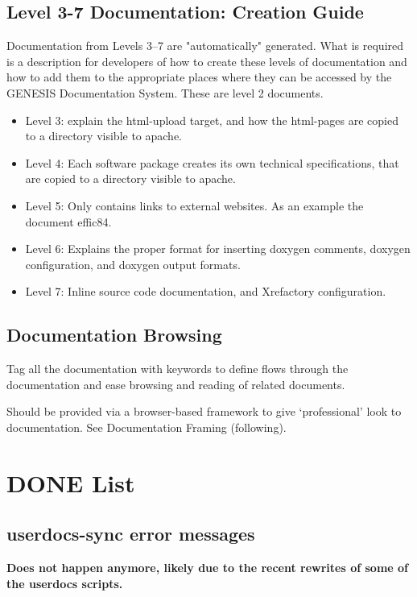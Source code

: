 \documentclass[12pt]{article}
\begin{document}
\subsection{Level 3-7 Documentation: Creation Guide}

Documentation from Levels 3--7 are "automatically" generated. What is
required is a description for developers of how to create these levels
of documentation and how to add them to the appropriate places where
they can be accessed by the GENESIS Documentation System.  These are
level 2 documents.

\begin{itemize}
\item Level 3: explain the html-upload target, and how the html-pages
  are copied to a directory visible to apache.
\item Level 4: Each software package creates its own technical
  specifications, that are copied to a directory visible to apache.
\item Level 5: Only contains links to external websites.  As an
  example the document effic84.
\item Level 6: Explains the proper format for inserting doxygen comments,
 doxygen configuration, and doxygen output formats.
\item Level 7: Inline source code documentation, and Xrefactory configuration. 
\end{itemize}

\subsection{Documentation Browsing}

Tag all the documentation with keywords to define flows through the
documentation and ease browsing and reading of related documents.

Should be provided via a browser-based framework to give
`professional' look to documentation. See Documentation Framing
(following).


\section{DONE List}

\subsection{userdocs-sync error messages}

{\bf Does not happen anymore, likely due to the recent rewrites of
  some of the userdocs scripts.}
\end{document}
